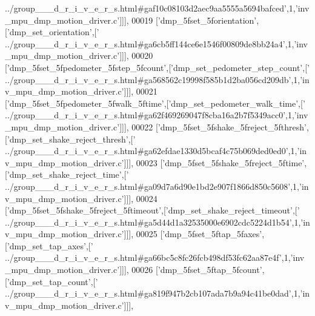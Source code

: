 \begin{DoxyCode}
{      ../group\_\_\_d\_r\_i\_v\_e\_r\_s.html#gaf10c08103d2aec9aa5555a5694bafced'},1,\textcolor{stringliteral}{'inv\_mpu\_dmp\_motion\_driver.c'}]]],
00019   [\textcolor{stringliteral}{'dmp\_5fset\_5forientation'},[\textcolor{stringliteral}{'dmp\_set\_orientation'},[\textcolor{stringliteral}{'
      ../group\_\_\_d\_r\_i\_v\_e\_r\_s.html#ga6cb5ff144ce6e1546f00809de8bb24a4'},1,\textcolor{stringliteral}{'inv\_mpu\_dmp\_motion\_driver.c'}]]],
00020   [\textcolor{stringliteral}{'dmp\_5fset\_5fpedometer\_5fstep\_5fcount'},[\textcolor{stringliteral}{'dmp\_set\_pedometer\_step\_count'},[\textcolor{stringliteral}{'
      ../group\_\_\_d\_r\_i\_v\_e\_r\_s.html#ga568562c19998f585b1d2ba056cd209db'},1,\textcolor{stringliteral}{'inv\_mpu\_dmp\_motion\_driver.c'}]]],
00021   [\textcolor{stringliteral}{'dmp\_5fset\_5fpedometer\_5fwalk\_5ftime'},[\textcolor{stringliteral}{'dmp\_set\_pedometer\_walk\_time'},[\textcolor{stringliteral}{'
      ../group\_\_\_d\_r\_i\_v\_e\_r\_s.html#ga62f469269047f8cba16a2b7f5349acc0'},1,\textcolor{stringliteral}{'inv\_mpu\_dmp\_motion\_driver.c'}]]],
00022   [\textcolor{stringliteral}{'dmp\_5fset\_5fshake\_5freject\_5fthresh'},[\textcolor{stringliteral}{'dmp\_set\_shake\_reject\_thresh'},[\textcolor{stringliteral}{'
      ../group\_\_\_d\_r\_i\_v\_e\_r\_s.html#ga62efdae1330d5bcaf4c75b069ded0ed0'},1,\textcolor{stringliteral}{'inv\_mpu\_dmp\_motion\_driver.c'}]]],
00023   [\textcolor{stringliteral}{'dmp\_5fset\_5fshake\_5freject\_5ftime'},[\textcolor{stringliteral}{'dmp\_set\_shake\_reject\_time'},[\textcolor{stringliteral}{'
      ../group\_\_\_d\_r\_i\_v\_e\_r\_s.html#ga09d7a6d90e1bd2e907f1866d850c5608'},1,\textcolor{stringliteral}{'inv\_mpu\_dmp\_motion\_driver.c'}]]],
00024   [\textcolor{stringliteral}{'dmp\_5fset\_5fshake\_5freject\_5ftimeout'},[\textcolor{stringliteral}{'dmp\_set\_shake\_reject\_timeout'},[\textcolor{stringliteral}{'
      ../group\_\_\_d\_r\_i\_v\_e\_r\_s.html#ga5d44d1a32535000e6902cdc5224d1b54'},1,\textcolor{stringliteral}{'inv\_mpu\_dmp\_motion\_driver.c'}]]],
00025   [\textcolor{stringliteral}{'dmp\_5fset\_5ftap\_5faxes'},[\textcolor{stringliteral}{'dmp\_set\_tap\_axes'},[\textcolor{stringliteral}{'
      ../group\_\_\_d\_r\_i\_v\_e\_r\_s.html#ga66bc5c8fc26fcb498df53fc62aa87e4f'},1,\textcolor{stringliteral}{'inv\_mpu\_dmp\_motion\_driver.c'}]]],
00026   [\textcolor{stringliteral}{'dmp\_5fset\_5ftap\_5fcount'},[\textcolor{stringliteral}{'dmp\_set\_tap\_count'},[\textcolor{stringliteral}{'
      ../group\_\_\_d\_r\_i\_v\_e\_r\_s.html#ga819f947b2cb107ada7b9a94c41be0dad'},1,\textcolor{stringliteral}{'inv\_mpu\_dmp\_motion\_driver.c'}]]],

\end{DoxyCode}
